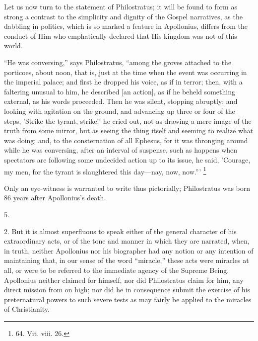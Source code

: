 Let us
now turn to the statement of Philostratus; it will be found to form as
strong a contrast to the simplicity and dignity of the Gospel
narratives, as the dabbling in politics, which is so marked a feature
in Apollonius, differs from the conduct of Him who emphatically
declared that His kingdom was not of this world.

``He was conversing,'' says Philostratus, ``among the groves attached to the
porticoes, about noon, that is, just at the time when the event was
occurring in the imperial palace; and first he dropped his voice, as
if in terror; then, with a faltering unusual to him, he described [an
action], as if he beheld something external, as his words proceeded.
Then he was silent, stopping abruptly; and looking with agitation on
the ground, and advancing up three or four of the steps, 'Strike the
tyrant, strike!' he cried out, not as drawing a mere image of the
truth from some mirror, but as seeing the thing itself and seeming to
realize what was doing; and, to the consternation of all Ephesus, for
it was thronging around while he was
conversing, after an interval of suspense, such as happens when
spectators are following some undecided action up to its issue, he
said, 'Courage, my men, for the tyrant is slaughtered this day—nay,
now, now.''' \footnote{64.
Vit. viii. 26.}

Only an eye-witness is
warranted to write thus pictorially; Philostratus was born 86 years
after Apollonius's death.

5.

2. But it is almost
superfluous to speak either of the general character of his
extraordinary acts, or of the tone and manner in which they are
narrated, when, in truth, neither Apollonius nor his biographer had
any notion or any intention of maintaining that, in our sense of the
word ``miracle,'' these acts were miracles at all, or were to be
referred to the immediate agency of the Supreme Being. Apollonius
neither claimed for himself, nor did Philostratus claim for him, any
direct mission from on high; nor did he in consequence submit the
exercise of his preternatural powers to such severe tests as may
fairly be applied to the miracles of Christianity.

